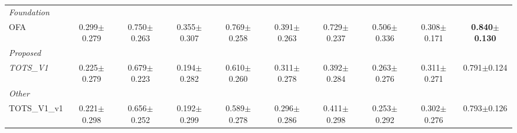 \begin{table}[t]
\begin{tabular}{lccccccccc}
\midrule
\multicolumn{10}{l}{\textit{Foundation}} \\
OFA & 0.299$\pm$0.279 & 0.750$\pm$0.263 & 0.355$\pm$0.307 & 0.769$\pm$0.258 & 0.391$\pm$0.263 & 0.729$\pm$0.237 & 0.506$\pm$0.336 & 0.308$\pm$0.171 & \textbf{0.840$\pm$0.130} \\
\midrule
\multicolumn{10}{l}{\textit{Proposed}} \\
\textit{TOTS\_V1} & 0.225$\pm$0.279 & 0.679$\pm$0.223 & 0.194$\pm$0.282 & 0.610$\pm$0.260 & 0.311$\pm$0.278 & 0.392$\pm$0.284 & 0.263$\pm$0.276 & 0.311$\pm$0.271 & 0.791$\pm$0.124 \\
\midrule
\multicolumn{10}{l}{\textit{Other}} \\
TOTS\_V1\_v1 & 0.221$\pm$0.298 & 0.656$\pm$0.252 & 0.192$\pm$0.299 & 0.589$\pm$0.278 & 0.296$\pm$0.286 & 0.411$\pm$0.298 & 0.253$\pm$0.292 & 0.302$\pm$0.276 & 0.793$\pm$0.126 \\
\bottomrule
\end{tabular}
\end{table}
